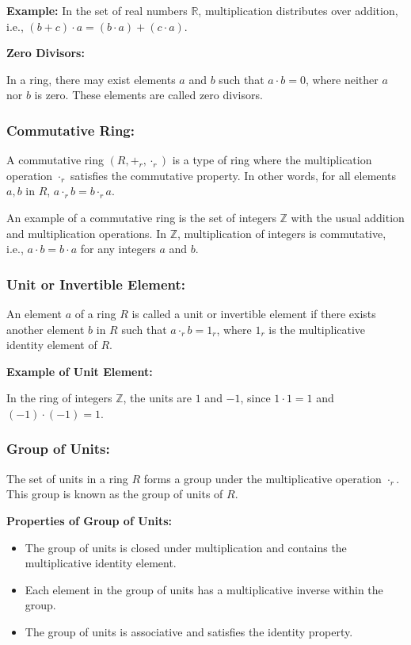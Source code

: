 \documentclass[11pt]{article}
\begin{document}
\textbf{Example:} In the set of real numbers \( \mathbb{R} \), multiplication distributes over addition, i.e., \( (b + c) \cdot a = (b \cdot a) + (c \cdot a) \).

\textbf{Zero Divisors:}

In a ring, there may exist elements \( a \) and \( b \) such that \( a \cdot b = 0 \), where neither \( a \) nor \( b \) is zero. These elements are called zero divisors.

\subsubsection{Commutative Ring:}

A commutative ring \( (R, +_r, \cdot_r) \) is a type of ring where the multiplication operation \( \cdot_r \) satisfies the commutative property. In other words, for all elements \( a, b \) in \( R \), \( a \cdot_r b = b \cdot_r a \).


An example of a commutative ring is the set of integers \( \mathbb{Z} \) with the usual addition and multiplication operations. In \( \mathbb{Z} \), multiplication of integers is commutative, i.e., \( a \cdot b = b \cdot a \) for any integers \( a \) and \( b \).

\subsubsection{Unit or Invertible Element:}

An element \( a \) of a ring \( R \) is called a unit or invertible element if there exists another element \( b \) in \( R \) such that \( a \cdot_r b = 1_r \), where \( 1_r \) is the multiplicative identity element of \( R \).

\textbf{Example of Unit Element:}

In the ring of integers \( \mathbb{Z} \), the units are \( 1 \) and \( -1 \), since \( 1 \cdot 1 = 1 \) and \( (-1) \cdot (-1) = 1 \).

\subsubsection{Group of Units:}

The set of units in a ring \( R \) forms a group under the multiplicative operation \( \cdot_r \). This group is known as the group of units of \( R \).


\textbf{Properties of Group of Units:}
\begin{itemize}
    \item The group of units is closed under multiplication and contains the multiplicative identity element.
    \item Each element in the group of units has a multiplicative inverse within the group.
    \item The group of units is associative and satisfies the identity property.
\end{itemize}
\end{document}
